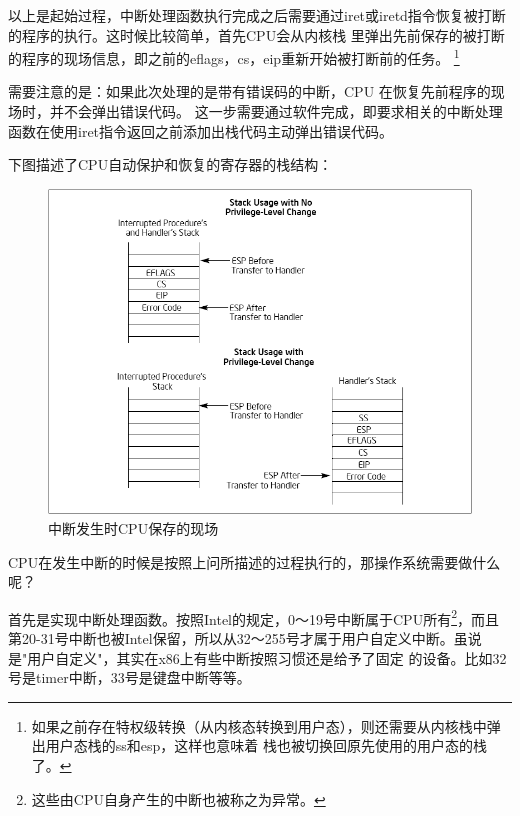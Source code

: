 \par 以上是起始过程，中断处理函数执行完成之后需要通过iret或iretd指令恢复被打断的程序的执行。这时候比较简单，首先CPU会从内核栈\allowbreak
里弹出先前保存的被打断的程序的现场信息，即之前的eflags，cs，eip重新开始被打断前的任务。\allowbreak
\footnote{如果之前存在特权级转换（从内核态转换到用户态），则还需要从内核栈中弹出用户态栈的ss和esp，这样也意味着\allowbreak
栈也被切换回原先使用的用户态的栈了。}
\par 需要注意的是：如果此次处理的是带有错误码的中断，CPU 在恢复先前程序的现场时，并不会弹出错误代码。\allowbreak
这一步需要通过软件完成，即要求相关的中断处理函数在使用iret指令返回之前添加出栈代码主动弹出错误代码。

\par 下图描述了CPU自动保护和恢复的寄存器的栈结构：
\begin{figure}[ht]
      \centering
      \includegraphics[scale=0.4]{picture/chapt7/interrupt_stack.png}
      \caption{中断发生时CPU保存的现场}
\end{figure}

\par CPU在发生中断的时候是按照上问所描述的过程执行的，那操作系统需要做什么呢？

\par 首先是实现中断处理函数。按照Intel的规定，0～19号中断属于CPU所有\footnote{这些由CPU自身产生的中断也被称之为异常。}，而且\allowbreak
第20-31号中断也被Intel保留，所以从32～255号才属于用户自定义中断。虽说是"用户自定义"，其实在x86上有些中断按照习惯还是给予了固定\allowbreak
的设备。比如32号是timer中断，33号是键盘中断等等。

